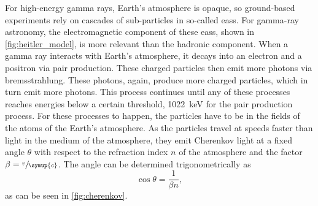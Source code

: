 For high-energy gamma rays, Earth's atmosphere is opaque, so ground-based experiments rely on
cascades of sub-particles in so-called \glspl{eas}. For gamma-ray astronomy, the electromagnetic
component of these \glspl{eas}, shown in \autoref{fig:heitler_model}, is more relevant
than the hadronic component. When a gamma ray interacts with Earth's atmosphere, it decays into an
electron and a positron via pair production. These charged particles then emit more photons via
bremsstrahlung. These photons, again, produce more charged particles, which in turn emit more
photons. This process continues until any of these processes reaches energies below a certain
threshold, \ie \SI{1022}{\kilo\eV} for the pair production process. For these processes to happen,
the particles have to be in the fields of the atoms of the Earth's atmosphere. As the particles
travel at speeds faster than light in the medium of the atmosphere, they emit Cherenkov light at
a fixed angle \(\theta\) with respect to the refraction index \(n\) of the atmosphere and the
factor \(\beta = \sfrac{v}{\symup{c}}\). The angle can be determined trigonometrically as
\begin{equation}
    \cos\theta = \frac{1}{\beta n},
\end{equation}
as can be seen in \autoref{fig:cherenkov}.

